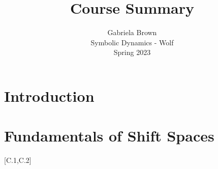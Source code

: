 \documentclass[11pt, reqno]{amsart}
\title{Course Summary}
\author{Gabriela Brown\\ Symbolic Dynamics - Wolf \\ Spring 2023}
\theoremstyle{plain}
\numberwithin{thm}{subsection}
\theoremstyle{definition}
\begin{document}
\maketitle

 {
  \setlength{\parskip}{4.4pt}   
  \tableofcontents
 }


\section{Introduction}

\section{Fundamentals of Shift Spaces}
\cite{lind-marc}[C.1,C.2]







\end{document}
